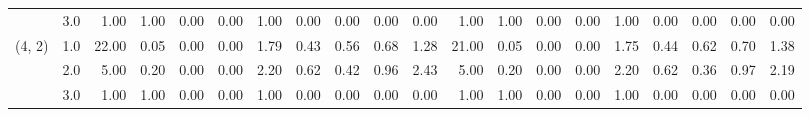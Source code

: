 \begin{tabular}{llrrrrrrrrrrrrrrrrrr}
       & 3.0 &               1.00 &                     1.00 &                                 0.00 &                             0.00 &                           1.00 &                                               0.00 &                                            0.00 &                                            0.00 &                                        0.00 &               1.00 &                     1.00 &                                 0.00 &                             0.00 &                           1.00 &                                               0.00 &                                            0.00 &                                            0.00 &                                        0.00 \\
(4, 2) & 1.0 &              22.00 &                     0.05 &                                 0.00 &                             0.00 &                           1.79 &                                               0.43 &                                            0.56 &                                            0.68 &                                        1.28 &              21.00 &                     0.05 &                                 0.00 &                             0.00 &                           1.75 &                                               0.44 &                                            0.62 &                                            0.70 &                                        1.38 \\
       & 2.0 &               5.00 &                     0.20 &                                 0.00 &                             0.00 &                           2.20 &                                               0.62 &                                            0.42 &                                            0.96 &                                        2.43 &               5.00 &                     0.20 &                                 0.00 &                             0.00 &                           2.20 &                                               0.62 &                                            0.36 &                                            0.97 &                                        2.19 \\
       & 3.0 &               1.00 &                     1.00 &                                 0.00 &                             0.00 &                           1.00 &                                               0.00 &                                            0.00 &                                            0.00 &                                        0.00 &               1.00 &                     1.00 &                                 0.00 &                             0.00 &                           1.00 &                                               0.00 &                                            0.00 &                                            0.00 &                                        0.00 \\

\end{tabular}

